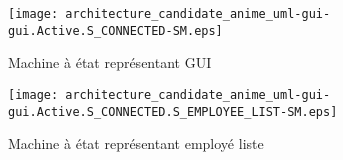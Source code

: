         \begin{figure} [H]
            \centering
            \texttt{[image: architecture\_candidate\_anime\_uml-gui-gui.Active.S\_CONNECTED-SM.eps]}
            \caption{Machine à état représentant GUI}
            \label{MaE_home_GUI}
        \end{figure}

        \begin{figure} [H]
            \centering
            \texttt{[image: architecture\_candidate\_anime\_uml-gui-gui.Active.S\_CONNECTED.S\_EMPLOYEE\_LIST-SM.eps]}
            \caption{Machine à état représentant employé liste}
            \label{MaE_home_GUI_employee_list}
        \end{figure}

\newpage

